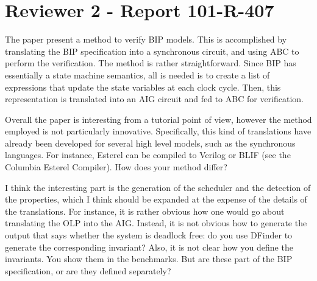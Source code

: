 \section{Reviewer 2 - Report 101-R-407}
%
%
The paper present a method to verify BIP models. This is accomplished by
translating the BIP specification into a synchronous circuit, and using ABC to
perform the verification. The method is rather straightforward. Since BIP has
essentially a state machine semantics, all is needed is to create a list of
expressions that update the state variables at each clock cycle. Then, this
representation is translated into an AIG circuit and fed to ABC for
verification.

Overall the paper is interesting from a tutorial point of view, however the
method employed is not particularly innovative. Specifically, this kind of
translations have already been developed for several high level models, such
as the synchronous languages. For instance, Esterel can be compiled to Verilog
or BLIF (see the Columbia Esterel Compiler). How does your method differ?

\done
{}

I think the interesting part is the generation of the scheduler and the
detection of the properties, which I think should be expanded at the expense
of the details of the translations. For instance, it is rather obvious how one
would go about translating the OLP into the AIG. Instead, it is not obvious
how to generate the output that says whether the system is deadlock free: do
you use DFinder to generate the corresponding invariant? Also, it is not clear
how you define the invariants. You show them in the benchmarks. But are these
part of the BIP specification, or are they defined separately?

